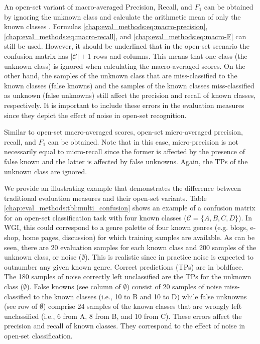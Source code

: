 An open-set variant of macro-averaged Precision, Recall, and $F_{1}$ can be obtained by ignoring the unknown class and calculate the arithmetic mean of only the known classes \parencite{mendesjunior2016}. Formulas \ref{chap:eval_methods:eq:macro-precision}, \ref{chap:eval_methods:eq:macro-recall}, and \ref{chap:eval_methods:eq:macro-F} can still be used. However, it should be underlined that in the open-set scenario the confusion matrix has $|\mathcal{C}|+1$ rows and columns. This means that one class (the unknown class) is ignored when calculating the macro-averaged scores. On the other hand, the samples of the unknown class that are miss-classified to the known classes (false knowns) and the samples of the known classes miss-classified as unknown (false unknowns) still affect the precision and recall of known classes, respectively. It is important to include these errors in the evaluation measures since they depict the effect of noise in open-set recognition.

Similar to open-set macro-averaged scores, open-set micro-averaged precision, recall, and $F_{1}$ can be obtained. Note that in this case, micro-precision is not necessarily equal to micro-recall since the former is affected by the presence of false known and the latter is affected by false unknowns. Again, the TPs of the unknown class are ignored. 

We provide an illustrating example that demonstrates the difference between traditional evaluation measures and their open-set variants. Table \ref{chap:eval_methods:tbl:multi_confusion} shows an example of a confusion matrix for an open-set classification task with four known classes ($\mathcal{C}=\{A,B,C,D\}$). In WGI, this could correspond to a genre palette of four known genres (e.g. blogs, e-shop, home pages, discussion) for which training samples are available. As can be seen, there are 20 evaluation samples for each known class and 200 samples of the unknown class, or noise ($\emptyset$). This is realistic since in practice noise is expected to outnumber any given known genre. Correct predictions (TPs) are in boldface. The 180 samples of noise correctly left unclassified are the TPs for the unknown class ($\emptyset$). False knowns (see column of $\emptyset$) consist of 20 samples of noise miss-classified to the known classes (i.e., 10 to B and 10 to D) while false unknowns (see row of $\emptyset$) comprise 24 samples of the known classes that are wrongly left unclassified (i.e., 6 from A, 8 from B, and 10 from C). These errors affect the precision and recall of known classes. They correspond to the effect of noise in open-set classification.


